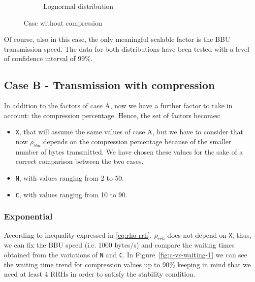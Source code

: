 \documentclass[11pt,a4paper,oneside, openright]{article}
\begin{document}
\begin{figure}
\begin{subfigure}{.5\textwidth}
  \caption{Lognormal distribution}
  \label{fig:case-a-log}
\end{subfigure}
\caption{Case without compression}
\label{fig:case-a}
\end{figure}

Of course, also in this case, the only meaningful scalable factor is the BBU transmission speed.
\bigbreak
\noindent The data for both distributions have been tested with a level of confidence interval of 99\%. 

\subsection{Case B - Transmission with compression}
In addition to the factors of case A, now we have a further factor to take in account: the compression percentage. Hence, the set of factors becomes:

\begin{itemize}
	\item \texttt{X}, that will assume the same values of case A, but we have to consider that now $ \rho_{bbu} $ depends on the compression percentage because of the smaller number of bytes transmitted. We have chosen these values for the sake of a correct comparison between the two cases.
	\item \texttt{N}, with values ranging from 2 to 50.
	\item \texttt{C}, with values ranging from 10 to 90.
\end{itemize}

\subsubsection{Exponential}
According to inequality expressed in \ref{eq:rho-rrh}, $ \rho_{rrh} $ does not depend on \texttt{X}, thus, we can fix the BBU speed (i.e. 1000 bytes/s) and compare the waiting times obtained from the variations of \texttt{N} and \texttt{C}. In Figure~\ref{fig:c-vs-waiting-1} we can see the waiting time trend for compression values up to 90\% keeping in mind that we need at least 4 RRHs in order to satisfy the stability condition.
\end{document}
